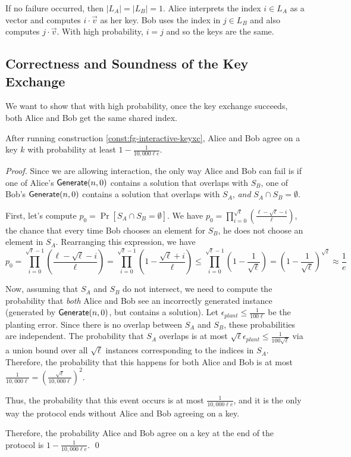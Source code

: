 \begin{construction}
\begin{itemize}
		If no failure occurred, then $|L_A| = |L_B| = 1$. Alice interprets the index $i \in L_A$ as a vector and computes $i \cdot \vec v$ as her key. Bob uses the index in $j \in L_B$ and also computes $j \cdot \vec v$. With high probability, $i = j$ and so the keys are the same.
	\end{itemize}
\end{construction}


\subsection{Correctness and Soundness of the Key Exchange}
We want to show that with high probability, once the key exchange succeeds, both Alice and Bob get the same shared index.

\begin{lemma}\label{lem:keyxc-is-correct}
	After running construction \ref{const:fg-interactive-keyxc}, Alice and Bob agree on a key $k$ with probability at least $1 - \frac{1}{10,000 \ell e}$.
\end{lemma}
\begin{proof}
	Since we are allowing interaction, the only way Alice and Bob can fail is if one of Alice's $\mathsf{Generate}(n,0)$ contains a solution that overlaps with $S_B$, one of Bob's $\mathsf{Generate}(n,0)$ contains a solution that overlaps with $S_A$, \emph{and} $S_A \cap S_B = \emptyset$.
	
	First, let's compute $p_0 = \Pr[S_A \cap S_B = \emptyset]$. We have $p_0 = \prod_{i = 0}^{\sqrt \ell} \left(\frac{\ell - \sqrt \ell - i}{\ell} \right)$, the chance that every time Bob chooses an element for $S_B$, he does not choose an element in $S_A$. Rearranging this expression, we have
	\[ p_0 = \prod_{i = 0}^{\sqrt \ell-1} \left(\frac{\ell - \sqrt \ell - i}{\ell} \right) = \prod_{i=0}^{\sqrt \ell-1} (1 - \frac{\sqrt{\ell} + i}{\ell})
	\le \prod_{i=0}^{\sqrt{\ell} - 1} \left( 1 - \frac{1}{\sqrt{\ell}} \right)
	= \left( 1 - \frac{1}{\sqrt{\ell}} \right)^{\sqrt{\ell}} \approx \frac{1}{e}
	\]
	
	Now, assuming that $S_A$ and $S_B$ do not intersect, we need to compute the probability that \emph{both} Alice and Bob see an incorrectly generated instance (generated by $\mathsf{Generate}(n,0)$, but contains a solution). Let $\epsilon_{plant} \le \frac{1}{100 \ell}$ be the planting error. Since there is no overlap between $S_A$ and $S_B$, these probabilities are independent. The probability that $S_A$ overlaps is at most $ \sqrt \ell \epsilon_{plant} \le \frac{1}{100 \sqrt \ell}$ via a union bound over all $\sqrt \ell$ instances corresponding to the indices in $S_A$. Therefore, the probability that this happens for both Alice and Bob is at most $ \frac{1}{10,000\ell} = \left(\frac{\sqrt \ell }{10,000\ell}\right)^2$.
	
	Thus, the probability that this event occurs is at most $\frac{1}{10,000 \ell e}$, and it is the only way the protocol ends without Alice and Bob agreeing on a key.
	
	Therefore, the probability Alice and Bob agree on a key at the end of the protocol is $1 - \frac{1}{10,000 \ell e}$. \qed
\end{proof}
